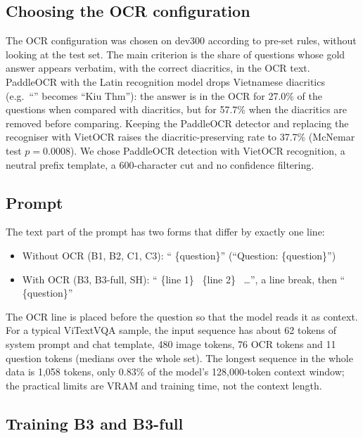 \subsection{Choosing the OCR configuration}

The OCR configuration was chosen on dev300 according to pre-set rules, without looking at
the test set. The main criterion is the share of questions whose gold answer appears
verbatim, with the correct diacritics, in the OCR text. PaddleOCR with the Latin
recognition model drops Vietnamese diacritics (e.g.\ ``'' becomes ``Kiu
Thm''): the answer is in the OCR for 27.0\% of the questions when compared with
diacritics, but for 57.7\% when the diacritics are removed before comparing. Keeping the
PaddleOCR detector and replacing the recogniser with VietOCR raises the
diacritic-preserving rate to 37.7\% (McNemar test $p = 0.0008$). We chose PaddleOCR
detection with VietOCR recognition, a neutral prefix template, a 600-character cut and no
confidence filtering.

\subsection{Prompt}
\label{sec:met-prompt}

The text part of the prompt has two forms that differ by exactly one line:

\begin{itemize}
  \item Without OCR (B1, B2, C1, C3): `` \{question\}'' (``Question:
  \{question\}'')
  \item With OCR (B3, B3-full, SH): `` \{line 1\}
  \textbar\ \{line 2\} \textbar\ \ldots'', a line break, then ``
  \{question\}''
\end{itemize}

The OCR line is placed before the question so that the model reads it as context. For a
typical ViTextVQA sample, the input sequence has about 62 tokens of system prompt and chat
template, 480 image tokens, 76 OCR tokens and 11 question tokens (medians over the whole
set). The longest sequence in the whole data is 1,058 tokens, only 0.83\% of the model's
128,000-token context window; the practical limits are VRAM and training time, not the
context length.

\subsection{Training B3 and B3-full}

